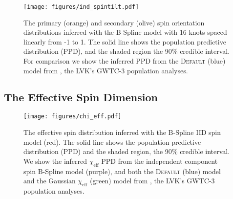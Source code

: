 \begin{figure}
    \begin{centering}
        \texttt{[image: figures/ind\_spintilt.pdf]}
        \caption{The primary (orange) and secondary (olive) spin orientation distributions inferred with the B-Spline model with 16 knots spaced linearly from -1 to 1. The solid line shows the population predictive distribution (PPD), and the shaded region the 90\% credible interval. 
        For comparison we show the inferred PPD from the \textsc{Default} (blue) model from \citet{o3b_astro_dist}, the LVK's GWTC-3 population analyses.}
        \label{fig:ind_spintilt_dist}
    \end{centering}
\end{figure}

\subsection{The Effective Spin Dimension}

\begin{figure} 
    \begin{centering}
        \texttt{[image: figures/chi\_eff.pdf]}
        \caption{The effective spin distribution inferred with the B-Spline IID spin model (red). The solid line shows the population predictive 
        distribution (PPD) and the shaded region, the 90\% credible interval. We show the inferred $\chi_\mathrm{eff}$ 
        PPD from the independent component spin B-Spline model (purple), and both the \textsc{Default} (blue) model and the 
        Gaussian $\chi_\mathrm{eff}$ (green) model from \citet{o3b_astro_dist}, the LVK's GWTC-3 population analyses.}
        \label{fig:chieff_dist}
    \end{centering}
\end{figure}

